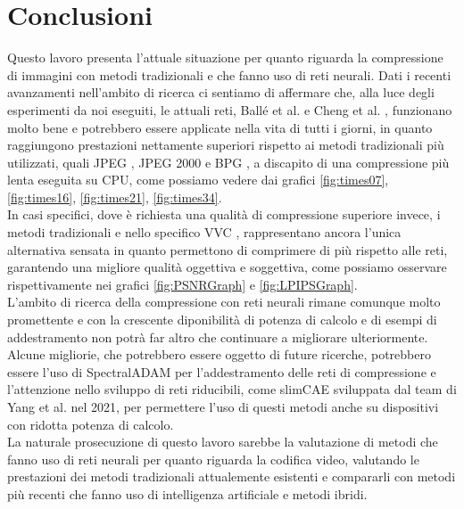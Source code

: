 \chapter{Conclusioni}
Questo lavoro presenta l’attuale situazione per quanto riguarda la compressione di immagini con metodi tradizionali e che fanno uso di reti neurali. Dati i recenti avanzamenti nell’ambito di ricerca ci sentiamo di affermare che, alla luce degli esperimenti da noi eseguiti, le attuali reti, Ballé et al. \cite{minnen2018joint} e Cheng et al. \cite{cheng2020learned}, funzionano molto bene e potrebbero essere applicate nella vita di tutti i giorni, in quanto raggiungono prestazioni nettamente superiori rispetto ai metodi tradizionali più utilizzati, quali JPEG \cite{125072}, JPEG 2000 \cite{952804} e BPG \cite{BPGImageformat}, a discapito di una compressione più lenta eseguita su CPU, come possiamo vedere dai grafici \ref{fig:times07}, \ref{fig:times16}, \ref{fig:times21}, \ref{fig:times34}.\\
In casi specifici, dove è richiesta una qualità di compressione superiore invece, i metodi tradizionali e nello specifico VVC \cite{9503377}, rappresentano ancora l’unica alternativa sensata in quanto permettono di comprimere di più rispetto alle reti, garantendo una migliore qualità oggettiva e soggettiva, come possiamo osservare rispettivamente nei grafici \ref{fig:PSNRGraph} e \ref{fig:LPIPSGraph}.\\
L’ambito di ricerca della compressione con reti neurali rimane comunque molto promettente e con la crescente diponibilità di potenza di calcolo e di esempi di addestramento non potrà far altro che continuare a migliorare ulteriormente. Alcune migliorie, che potrebbero essere oggetto di future ricerche, potrebbero essere l’uso di SpectralADAM \cite{balle2018efficient} per l’addestramento delle reti di compressione e l’attenzione nello sviluppo di reti riducibili, come slimCAE \cite{yang2021slimmable} sviluppata dal team di Yang et al. nel 2021, per permettere l’uso di questi metodi anche su dispositivi con ridotta potenza di calcolo.\\
La naturale prosecuzione di questo lavoro sarebbe la valutazione di metodi che fanno uso di reti neurali per quanto riguarda la codifica video, valutando le prestazioni dei metodi tradizionali attualemente esistenti e compararli con metodi più recenti che fanno uso di intelligenza artificiale e metodi ibridi.\\

